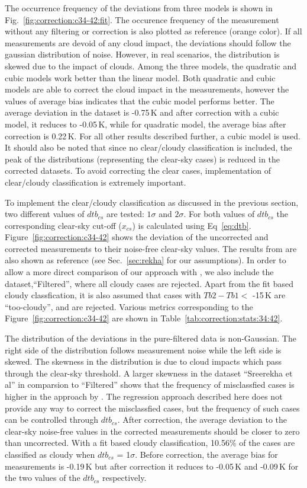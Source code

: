 \documentclass[12pt]{article}
\begin{document}
The occurrence frequency of the deviations from three models is shown in
Fig.~\ref{fig:correction:c34-42:fit}. The occurence frequency of the measurement
without any filtering or correction is also plotted as reference (orange
color). If all measurements are devoid of any cloud impact, the deviations
should follow the gaussian distribution of noise. However, in real scenarios,
the distribution is skewed due to the impact of clouds. Among the three models, the quadratic and cubic models work
better than the linear model. Both quadratic and cubic models are able to
correct the cloud impact in the measurements, however the values of average
bias indicates that the cubic model performs better. The average deviation in
the dataset is -0.75\,K and after correction with a cubic model, it reduces to
-0.05\,K, while for quadratic model, the average bias after correction is
0.22\,K. For all other results described further, a cubic model is
used. It should also be noted
that since no clear/cloudy classification is included, the peak of the distributions (representing the clear-sky cases) is reduced in the corrected datasets. 
To avoid correcting the clear cases, implementation of clear/cloudy classification is extremely important.

To implement the clear/cloudy classification as discussed in the previous
section, two different values of $dtb_{cs}$ are tested: $1\sigma$ and
$2\sigma$. For both values of $dtb_{cs}$ the corresponding clear-sky cut-off
($x_{cs}$) is calculated using Eq~\ref{eq:dtb}.
Figure~\ref{fig:correction:c34-42} shows the deviation of the uncorrected and
corrected measurements to their noise-free clear-sky values. The results from
\cite{rekha2012potential} are also shown as reference (see Sec.~\ref{sec:rekha}
for our assumptions). In order to allow a more direct comparison of our
approach with \cite{rekha2012potential}, we also include the
dataset,``Filtered'', where all cloudy cases are rejected. Apart from the fit
based cloudy classfication, it is also assumed that cases with $Tb2-Tb1 < $
-15\,K are ``too-cloudy'', and are rejected. Various metrics corresponding to
the Figure~\ref{fig:correction:c34-42} are shown in
Table~\ref{tab:correction:stats:34:42}.

The distribution of the deviations in the pure-filtered data is non-Gaussian. The
right side of the distribution follows measurement noise while the left
side is skewed. The skewness in the distribution is due to cloud impacts which
pass through the clear-sky threshold. A larger skewness in the dataset ``Sreerekha et al'' in comparsion to ``Filtered'' shows that the frequency of misclassfied cases is higher in the approach by \cite{rekha2012potential}. The regression approach described here does not provide any way to correct the misclassfied cases, but the frequency of such cases can be controlled through $dtb_{cs}$. After correction, the average deviation to the clear-sky noise-free values in the corrected measurements should be closer to zero than uncorrected. With a fit based cloudy classification, 10.56\% of the cases are classified as cloudy when $dtb_{cs}$
= 1$\sigma$.  Before correction, the average bias for measurements is -0.19\,K
but after correction it reduces to -0.05\,K and -0.09\,K for the two values of
the $dtb_{cs}$ respectively. 
\end{document}
